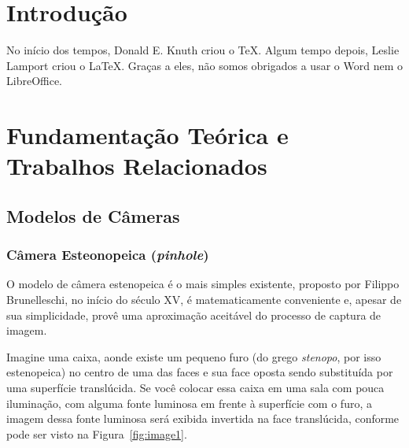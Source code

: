 \documentclass[ecp,tc]{iiufrgs}
\begin{document}

\listoffigures

\listoftables

\tableofcontents


\chapter{Introdução}
No início dos tempos, Donald E. Knuth criou o \TeX. Algum tempo depois, Leslie Lamport criou o \LaTeX. Graças a eles, não somos obrigados a usar o Word nem o LibreOffice.

\chapter{Fundamentação Teórica e Trabalhos Relacionados}

\section{Modelos de Câmeras}

\subsection{Câmera Esteonopeica (\textit{pinhole})}
O  modelo  de  câmera  estenopeica  é  o  mais  simples  existente,  proposto  por  Filippo Brunelleschi, no início do século XV, é matematicamente conveniente e, apesar de sua simplicidade, provê uma aproximação aceitável do processo de captura de imagem.

Imagine uma caixa, aonde existe um pequeno furo (do grego \textit{stenopo}, por isso estenopeica) no centro de uma das faces e sua face oposta sendo substituída por uma superfície translúcida. Se você colocar essa caixa em uma sala com pouca iluminação, com alguma fonte luminosa em frente à superfície com o furo, a imagem dessa fonte luminosa será exibida invertida na face translúcida, conforme pode ser visto na Figura~\ref{fig:image1}.
\end{document}
